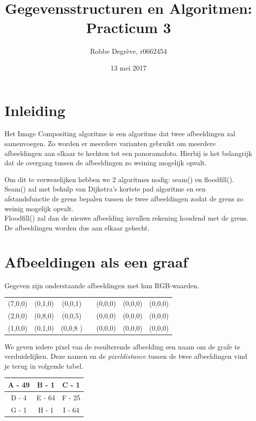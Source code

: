 \documentclass{article}
\title{Gegevensstructuren en Algoritmen: Practicum 3}
\author{Robbe Degr\`eve, r0662454}
\date{13 mei 2017}
\begin{document}
\maketitle
\newpage

\section*{Inleiding}
Het Image Compositing algoritme is een algoritme dat twee afbeeldingen zal samenvoegen. Zo worden er meerdere varianten gebruikt om meerdere
afbeeldingen aan elkaar te hechten tot een panoramafoto. Hierbij is het belangrijk dat de overgang tussen de afbeeldingen zo weining mogelijk opvalt.

Om dit te verwezelijken hebben we 2 algoritmes nodig: seam() en floodfill().\\
Seam() zal met behulp van Dijkstra's kortste pad algoritme en een afstandsfunctie de grens bepalen tussen de twee afbeeldingen zodat de grens zo weinig mogelijk opvalt.
\\Floodfill() zal dan de nieuwe afbeelding invullen rekening houdend met de grens. De afbeeldingen worden dus aan elkaar gehecht.
\newpage
\section{Afbeeldingen als een graaf}
Gegeven zijn onderstaande afbeeldingen met hun RGB-waarden.

\begin{tabular}{| c | c | c | c | c | c | c |}
\cline{1-3} \cline{5-7}
 (7,0,0) & (0,1,0) & (0,0,1) &  & (0,0,0) & (0,0,0) & (0,0,0)\\
  \cline{1-3} \cline{5-7}
 (2,0,0) & (0,8,0) & (0,0,5) &  & (0,0,0) & (0,0,0) & (0,0,0)\\
  \cline{1-3} \cline{5-7}
  (1,0,0) & (0,1,0) & (0,0,8 )&  & (0,0,0) & (0,0,0) & (0,0,0) \\
  \cline{1-3} \cline{5-7}
\end{tabular}

We geven iedere pixel van de resulterende afbeelding een naam om de grafe te verduidelijken. Deze namen en de \textit{pixeldistance} tussen de twee afbeeldingen vind je terug in volgende tabel.

\begin{tabular}{|c|c|c|}
  \hline
  A - 49 & B - 1 & C - 1 \\
  \hline
  D - 4 & E - 64 & F - 25 \\
  \hline
  G - 1 & H - 1 & I - 64 \\
  \hline
\end{tabular}
\end{document}
